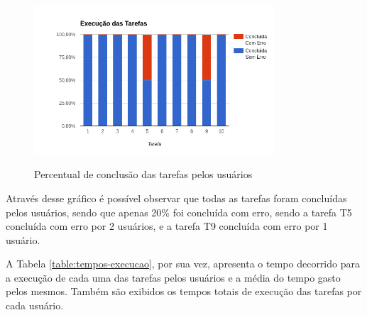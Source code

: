 \begin{figure}[!htb]
    \centering
    \caption{Percentual de conclusão das tarefas pelos usuários}
    \includegraphics[width=0.8\textwidth]{./04-figuras/avaliacao-tarefas}
    \label{fig:avaliacao-tarefas}
\end{figure}

Através desse gráfico é possível observar que todas as tarefas foram concluídas pelos 
usuários, sendo que apenas 20\% foi concluída com erro, sendo a tarefa T5 concluída com 
erro por 2 usuários, e a tarefa T9 concluída com erro por 1 usuário.

A Tabela \ref{table:tempos-execucao}, por sua vez, apresenta o tempo decorrido para a execução 
de cada uma das tarefas pelos usuários e a média do tempo gasto pelos mesmos. Também são 
exibidos os tempos totais de execução das tarefas por cada usuário.

